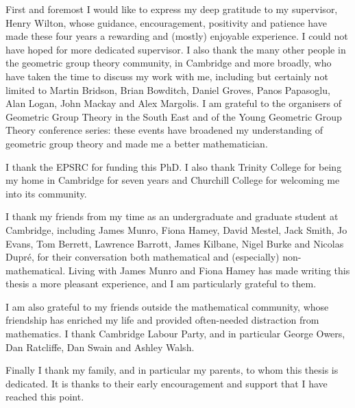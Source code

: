 \begin{acknowledgements}

  First and foremost I would like to express my deep gratitude to my supervisor, Henry Wilton, whose guidance, encouragement, positivity and patience have made these four years a rewarding and (mostly) enjoyable experience.
  I could not have hoped for more dedicated supervisor.
  I also thank the many other people in the geometric group theory community, in Cambridge and more broadly, who have taken the time to discuss my work with me, including but certainly not limited to Martin Bridson, Brian Bowditch, Daniel Groves, Panos Papasoglu, Alan Logan, John Mackay and Alex Margolis.
  I am grateful to the organisers of Geometric Group Theory in the South East and of the Young Geometric Group Theory conference series: these events have broadened my understanding of geometric group theory and made me a better mathematician.

  I thank the EPSRC for funding this PhD.
  I also thank Trinity College for being my home in Cambridge for seven years and Churchill College for welcoming me into its community.

  I thank my friends from my time as an undergraduate and graduate student at Cambridge, including James Munro, Fiona Hamey, David Mestel, Jack Smith, Jo Evans, Tom Berrett, Lawrence Barrott, James Kilbane, Nigel Burke and Nicolas Dupr\'e, for their conversation both mathematical and (especially) non-mathematical.
  Living with James Munro and Fiona Hamey has made writing this thesis a more pleasant experience, and I am particularly grateful to them.

  I am also grateful to my friends outside the mathematical community, whose friendship has enriched my life and provided often-needed distraction from mathematics.
  I thank Cambridge Labour Party, and in particular George Owers, Dan Ratcliffe, Dan Swain and Ashley Walsh.

  Finally I thank my family, and in particular my parents, to whom this thesis is dedicated.
  It is thanks to their early encouragement and support that I have reached this point.

\end{acknowledgements}

